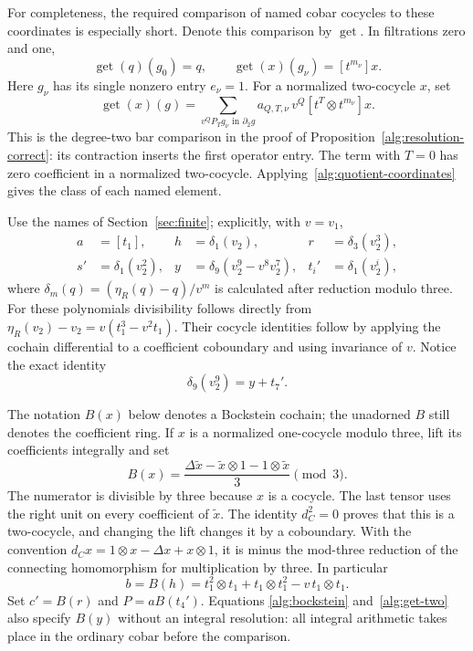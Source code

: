 For completeness, the required comparison of named cobar cocycles to
these coordinates is especially short.  Denote this comparison by
$\operatorname{get}$.  In filtrations zero and one,
\[
 \operatorname{get}(q)(g_0)=q,\qquad
 \operatorname{get}(x)(g_\nu)=[t^{m_\nu}]x.
\]
Here $g_\nu$ has its single nonzero entry $e_\nu=1$.  For a normalized
two-cocycle $x$, set
\begin{equation}\label{alg:get-two}
 \operatorname{get}(x)(g)
   =\sum_{v^QP_Tg_\nu\text{ in }\partial_2g}
       a_{Q,T,\nu}\,v^Q[t^T\otimes t^{m_\nu}]x.
\end{equation}
This is the degree-two bar comparison in the proof of
Proposition~\ref{alg:resolution-correct}: its contraction inserts the
first operator entry.  The term with $T=0$ has zero coefficient in a
normalized two-cocycle.  Applying~\eqref{alg:quotient-coordinates} gives
the class of each named element.

Use the names of Section~\ref{sec:finite}; explicitly, with $v=v_1$,
\begin{align*}
 a&=[t_1],& h&=\delta_1(v_2),& r&=\delta_3(v_2^3),\\
 s'&=\delta_1(v_2^2),&
 y&=\delta_9(v_2^9-v^8v_2^7),&
 t_i'&=\delta_1(v_2^i),
\end{align*}
where $\delta_m(q)=(\eta_R(q)-q)/v^m$ is calculated after reduction
modulo three.  For these polynomials divisibility follows directly from
$\eta_R(v_2)-v_2=v(t_1^3-v^2t_1)$.  Their cocycle identities follow by
applying the cochain differential to a coefficient coboundary and
using invariance of $v$.  Notice the exact identity
\begin{equation}\label{alg:y-convention}
 \delta_9(v_2^9)=y+t_7'.
\end{equation}

The notation $B(x)$ below denotes a Bockstein cochain; the unadorned
$B$ still denotes the coefficient ring.
If $x$ is a normalized one-cocycle modulo three, lift its coefficients
integrally and set
\begin{equation}\label{alg:bockstein}
 B(x)=\frac{\Delta\widetilde x-\widetilde x\otimes1
                           -1\otimes\widetilde x}{3}\pmod3.
\end{equation}
The numerator is divisible by three because $x$ is a cocycle.  The
last tensor uses the right unit on every coefficient of $\widetilde x$.
The identity $d_C^2=0$ proves that this is a two-cocycle, and changing
the lift changes it by a coboundary.  With the convention
$d_Cx=1\otimes x-\Delta x+x\otimes1$, it is minus the mod-three
reduction of the connecting homomorphism for multiplication by three.
In particular
\begin{equation}\label{alg:b-sign-check}
 b=B(h)=t_1^2\otimes t_1+t_1\otimes t_1^2
                           -v\,t_1\otimes t_1.
\end{equation}
Set $c'=B(r)$ and $P=aB(t_4')$.  Equations
\eqref{alg:bockstein} and~\eqref{alg:get-two} also specify $B(y)$
without an integral resolution: all integral arithmetic takes place in
the ordinary cobar before the comparison.


